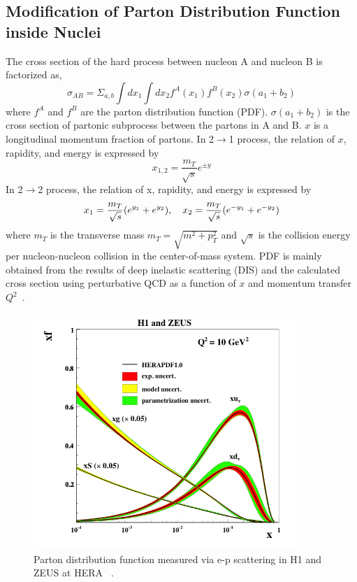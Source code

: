 \subsection{Modification of Parton Distribution Function inside Nuclei}
\label{sec_2_pdf}
The cross section of the hard process between nucleon A and nucleon B is factorized as, 
\begin{equation}
  \sigma_{AB} =  \Sigma_{a, b} \int{dx_{1}}\int{dx_{2}} f^{A}(x_{1})f^{B}(x_{2})\sigma(a_{1}+b_{2})
\end{equation}
where $f^{A}$ and $f^{B}$ are the  parton distribution function (PDF). 
$\sigma(a_{1}+b_{2})$ is the cross section of partonic subprocess between the partons in A and B.
$x$ is a longitudinal momentum fraction of partons. 
In 2$\rightarrow$1 process, the relation of $x$,  rapidity, and energy is expressed by 
\begin{equation}
  x_{1, 2} = \frac{m_{T}}{\sqrt{s}}e^{\pm y}
\end{equation}
In 2$\rightarrow$2 process, the relation of x,  rapidity, and energy is expressed by 
\begin{equation}
  x_{1} = \frac{m_{T}}{\sqrt{s}}(e^{y_{1}}+e^{y_{2}}),  \\
 ~~~  x_{2} = \frac{m_{T}}{\sqrt{s}}(e^{-y_{1}}+e^{-y_{2}}) \\
\end{equation}
where $m_{T}$ is the transverse mass $m_{T}=\sqrt{m^{2}+p_{T}^{2}}$ and $\sqrt{s}$ is the collision energy per nucleon-nucleon collision in the center-of-mass system.
PDF is mainly obtained from the results of deep inelastic scattering (DIS) and the calculated cross section using perturbative QCD as a function of $x$ and momentum transfer $Q^{2}$~\cite{bib_dis}. 
\begin{figure}[!h]
  \centering
  \includegraphics[width=10cm]{chap2/figure/CNM/hera.png}
  \caption{Parton distribution function measured via e-p scattering in H1 and ZEUS at HERA ~\cite{bib_hera}.}
  \label{fig_2_protonpdf}
\end{figure}

